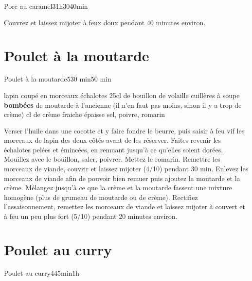 {\begin{recette}{Porc au caramel}{3}{1h30}{40min}
\begin{cuisson}
Couvrez et laissez mijoter à feux doux pendant 40 minutes environ.
\end{cuisson}
\end{recette}

\section{Poulet à la moutarde}
\begin{recette}{Poulet à la moutarde}{5}{30 min}{50 min}
\begin{ingredients}[6 pers.]
 lapin coupé en morceaux
 échalotes
\ingredient 25cl de bouillon de volaille
 cuillères à soupe \textbf{bombées} de moutarde à l'ancienne (il n'en faut pas moins, sinon il y a trop de crème)
 cl de crème fraiche épaisse
\ingredient sel, poivre, romarin
\end{ingredients}

\begin{preparation}
\etape Verser l'huile dans une cocotte et y faire fondre le beurre, puis saisir à feu vif les morceaux de lapin des deux côtés 
avant de les réserver.
\etape Faites revenir les échalotes pelées et émincées, en remuant jusqu'à ce qu'elles soient dorées.
\etape Mouillez avec le bouillon, saler, poivrer. Mettez le romarin. Remettre les morceaux de viande, couvrir et laissez mijoter (4/10) pendant 30 min.
\etape Enlevez les morceaux de viande afin de pouvoir bien remuer puis ajoutez la moutarde et la crème. Mélangez 
jusqu'à ce que la crème et la moutarde fassent une mixture homogène (plus de grumeau de moutarde ou de crème). 
\etape Rectifiez l'assaisonnement, remettez les morceaux de viande et laissez mijoter à couvert et à feu un peu plus fort (5/10) pendant 20 minutes environ.
\end{preparation}
\end{recette}

\section{Poulet au curry}
\begin{recette}{Poulet au curry}{4}{45min}{1h}


\end{recette}}
